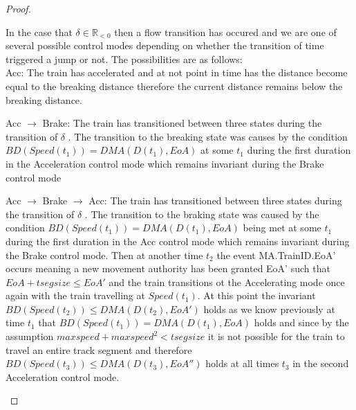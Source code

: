\begin{mytheorem}
\begin{proof}
\begin{description}
In the case that $\delta \in \mathbb{R}_{< 0}$ then a flow transition has occured and we are one of several
possible control modes depending on whether the transition of time triggered a jump or not.  The possibilities are as follows: \\

Acc: The train has accelerated and at not point in time has the distance become equal to the breaking distance therefore the current distance remains below the breaking distance. 


Acc $\to$ Brake: The train has transitioned between three states during the transition of $\delta$  . The transition to the breaking state was causes by the condition $BD(Speed(t_1)) = DMA(D(t_1), EoA)$ at some $t_1$ during the first duration in the Acceleration control mode which remains invariant during the Brake control mode 

Acc $\to$ Brake $\to$ Acc: The train has transitioned between three states during the transition of $\delta$  . The transition to the braking state was caused by the condition $BD(Speed(t_1)) = DMA(D(t_1), EoA)$ being met at some $t_1$ during the first duration in the Acc control mode which remains invariant during the Brake control mode. Then at another time $t_2$ the event MA.TrainID.EoA' occurs meaning a new movement authority has been granted EoA' such that $EoA + tsegsize \leq EoA'$ and the train transitions ot the Accelerating mode once again with the train travelling at $Speed(t_1)$.  At this point the invariant $BD(Speed(t_2)) \leq DMA(D(t_2), EoA')$ holds as we know previously at time $t_1$ that $BD(Speed(t_1)) = DMA(D(t_1), EoA)$ holds and since by the assumption $maxspeed + maxspeed^2 < tsegsize$ it is not possible for the train to travel an entire track segment and therefore $BD(Speed(t_3)) \leq DMA(D(t_3), EoA'')$ holds at all times $t_3$ in the second Acceleration control mode. 

\end{description}
\end{proof}
\end{mytheorem}
